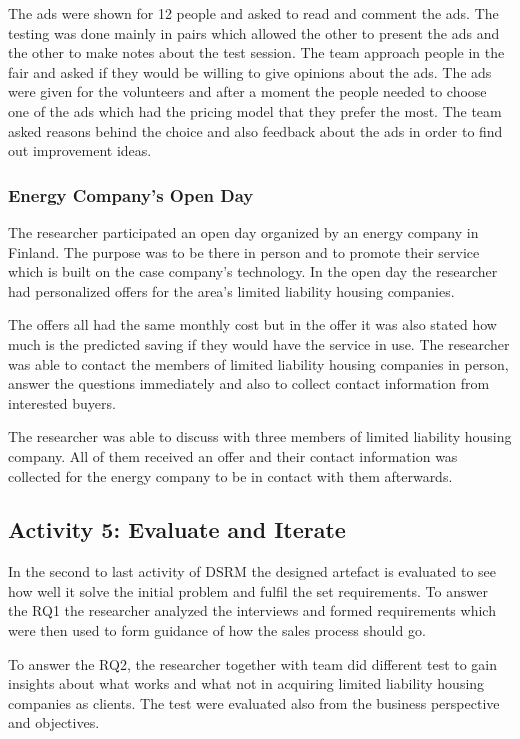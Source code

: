The ads were shown for 12 people and asked to read and comment the ads. The testing was done mainly in pairs which allowed the other to present the ads and the other to make notes about the test session. The team approach people in the fair and asked if they would be willing to give opinions about the ads. The ads were given for the volunteers and after a moment the people needed to choose one of the ads which had the pricing model that they prefer the most. The team asked reasons behind the choice and also feedback about the ads in order to find out improvement ideas.

\subsubsection*{Energy Company's Open Day}

The researcher participated an open day organized by an energy company in Finland. The purpose was to be there in person and to promote their service which is built on the case company's technology. In the open day the researcher had personalized offers for the area's limited liability housing companies.

The offers all had the same monthly cost but in the offer it was also stated how much is the predicted saving if they would have the service in use. The researcher was able to contact the members of limited liability housing companies in person, answer the questions immediately and also to collect contact information from interested buyers.

The researcher was able to discuss with three members of limited liability housing company. All of them received an offer and their contact information was collected for the energy company to be in contact with them afterwards.

\subsection{Activity 5: Evaluate and Iterate}

In the second to last activity of DSRM the designed artefact is evaluated to see how well it solve the initial problem and fulfil the set requirements. To answer the RQ1 the researcher analyzed the interviews and formed requirements which were then used to form guidance of how the sales process should go.

To answer the RQ2, the researcher together with team did different test to gain insights about what works and what not in acquiring limited liability housing companies as clients. The test were evaluated also from the business perspective and objectives.

